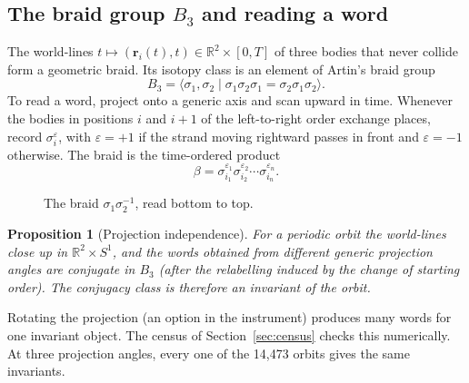 \documentclass[11pt]{article}
\newtheorem{proposition}{Proposition}
\theoremstyle{remark}
\newcommand{\R}{\mathbb{R}}
\begin{document}
\subsection{The braid group $B_3$ and reading a word}

The world-lines $t\mapsto(\mathbf r_i(t),t)\in\R^2\times[0,T]$ of three bodies that never collide form a
geometric braid. Its isotopy class is an element of Artin's braid group
\begin{equation}
  B_3=\langle\sigma_1,\sigma_2\mid\sigma_1\sigma_2\sigma_1=\sigma_2\sigma_1\sigma_2\rangle .
\end{equation}
To read a word, project onto a generic axis and scan upward in time. Whenever the bodies in positions $i$ and
$i+1$ of the left-to-right order exchange places, record $\sigma_i^{\varepsilon}$, with $\varepsilon=+1$ if
the strand moving rightward passes in front and $\varepsilon=-1$ otherwise. The braid is the time-ordered
product
\begin{equation}
  \beta=\sigma_{i_1}^{\varepsilon_1}\sigma_{i_2}^{\varepsilon_2}\cdots\sigma_{i_n}^{\varepsilon_n}.
  \label{eq:word}
\end{equation}

\begin{figure}[h]
\centering
{}
\caption{The braid $\sigma_1\sigma_2^{-1}$, read bottom to top.}
\label{fig:golden}
\end{figure}

\begin{proposition}[Projection independence]
For a periodic orbit the world-lines close up in $\R^2\times S^1$, and the words obtained from different
generic projection angles are conjugate in $B_3$ (after the relabelling induced by the change of starting
order). The conjugacy class is therefore an invariant of the orbit.
\end{proposition}
\noindent Rotating the projection (an option in the instrument) produces many words for one invariant object.
The census of Section~\ref{sec:census} checks this numerically. At three projection angles, every one of the
14{,}473 orbits gives the same invariants.
\end{document}

